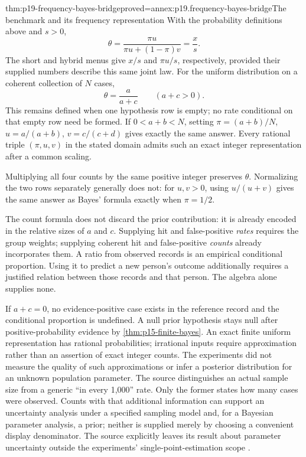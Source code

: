 \begin{hbtheorem}{thm:p19-frequency-bayes-bridge}{proved=annex:p19.frequency-bayes-bridge}{The benchmark and its frequency representation}
With the probability definitions above and \(s>0\),
\[
 \theta=\frac{\pi u}{\pi u+(1-\pi)v}=\frac{x}{s}.
\]
The short and hybrid menus give \(x/s\) and \(\pi u/s\), respectively,
provided their supplied numbers describe this same joint law.
For the uniform distribution on a coherent collection of \(N\) cases,
\[
 \theta=\frac{a}{a+c}\qquad(a+c>0).
\]
This remains defined when one hypothesis row is empty; no rate conditional
on that empty row need be formed. If \(0<a+b<N\), setting
\(\pi=(a+b)/N\), \(u=a/(a+b)\), \(v=c/(c+d)\) gives exactly the same
answer. Every rational triple \((\pi,u,v)\) in the stated domain admits
such an exact integer representation after a common scaling.

Multiplying all four counts by the same positive integer preserves
\(\theta\). Normalizing the two rows separately generally does not:
for \(u,v>0\), using \(u/(u+v)\) gives the same answer as Bayes' formula
exactly when \(\pi=1/2\).
\end{hbtheorem}

The count formula does not discard the prior contribution: it is already
encoded in the relative sizes of \(a\) and \(c\). Supplying hit and
false-positive \emph{rates} requires the group weights; supplying coherent
hit and false-positive \emph{counts} already incorporates them. A ratio
from observed records is an empirical conditional proportion. Using it to
predict a new person's outcome additionally requires a justified relation
between those records and that person. The algebra alone supplies none.

If \(a+c=0\), no evidence-positive case exists in the reference record and
the conditional proportion is undefined. A null prior hypothesis stays null
after positive-probability evidence by \cref{thm:p15-finite-bayes}.
An exact finite uniform representation has rational probabilities; irrational
inputs require approximation rather than an assertion of exact integer counts.
The experiments did not measure the quality of such approximations or infer
a posterior distribution for an unknown population parameter.
The source distinguishes an actual sample size from a generic ``in every
1,000'' rate. Only the former states how many cases were observed. Counts
with that additional information can support an uncertainty analysis under
a specified sampling model and, for a Bayesian parameter analysis, a prior;
neither is supplied merely by choosing a convenient display denominator.
The source explicitly leaves its result about parameter uncertainty outside
the experiments' single-point-estimation scope
\cite[pp.~687--689]{GigerenzerHoffrage1995FrequencyFormats}.

